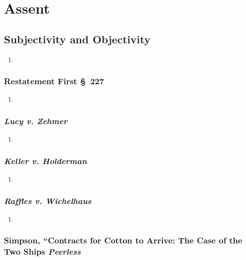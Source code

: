 \section{Assent}

\subsection{Subjectivity and Objectivity}

\begin{enumerate}
    \item %
\end{enumerate}

\subsubsection{Restatement First \S\ 227}

\begin{enumerate}
    \item %
\end{enumerate}

\subsubsection{\emph{Lucy v. Zehmer}}

\begin{enumerate}
    \item %
\end{enumerate}

\subsubsection{\emph{Keller v. Holderman}}

\begin{enumerate}
    \item %
\end{enumerate}

\subsubsection{\emph{Raffles v. Wichelhaus}}

\begin{enumerate}
    \item %
\end{enumerate}

\subsubsection{Simpson, ``Contracts for Cotton to Arrive: The Case of the Two 
Ships \emph{Peerless}}

